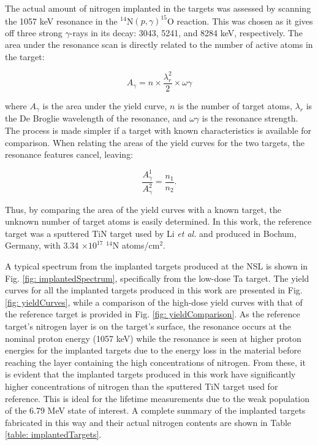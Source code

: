 The actual amount of nitrogen implanted in the targets was assessed by scanning the 1057 keV resonance in the $^{14}$N$\left( p,\gamma \right) ^{15}$O reaction. This was chosen as it gives off three strong $\gamma$-rays in its decay: 3043, 5241, and 8284 keV, respectively. The area under the resonance scan is directly related to the number of active atoms in the target:

\begin{equation}
A_{\gamma} = n \times \dfrac{\lambda_{r}^{2}}{2} \times \omega\gamma
\label{eqn: targetYield}
\end{equation}

\noindent where $A_{\gamma}$ is the area under the yield curve, $n$ is the number of target atoms, $\lambda_{r}$ is the De Broglie wavelength of the resonance, and $\omega\gamma$ is the resonance strength. The process is made simpler if a target with known characteristics is available for comparison. When relating the areas of the yield curves for the two targets, the resonance features cancel, leaving:

\begin{equation}
\dfrac{A_{\gamma}^{1}}{A_{\gamma}^{2}} = \dfrac{n_{1}}{n_{2}}.
\end{equation}

\noindent Thus, by comparing the area of the yield curves with a known target, the unknown number of target atoms is easily determined. In this work, the reference target was a sputtered TiN target used by Li \textit{et al.} \cite{Li2016} and produced in Bochum, Germany, with 3.34 $\times 10^{17}$ $^{14}$N atoms/cm$^{2}$. 

A typical spectrum from the implanted targets produced at the NSL is shown in Fig. \ref{fig: implantedSpectrum}, specifically from the low-dose Ta target. The yield curves for all the implanted targets produced in this work are presented in Fig. \ref{fig: yieldCurves}, while a comparison of the high-dose yield curves with that of the reference target is provided in Fig. \ref{fig: yieldComparison}. As the reference target's nitrogen layer is on the target's surface, the resonance occurs at the nominal proton energy (1057 keV) while the resonance is seen at higher proton energies for the implanted targets due to the energy loss in the material before reaching the layer containing the high concentrations of nitrogen. From these, it is evident that the implanted targets produced in this work have significantly higher concentrations of nitrogen than the sputtered TiN target used for reference. This is ideal for the lifetime measurements due to the weak population of the 6.79 MeV state of interest. A complete summary of the implanted targets fabricated in this way and their actual nitrogen contents are shown in Table \ref{table: implantedTargets}. 



